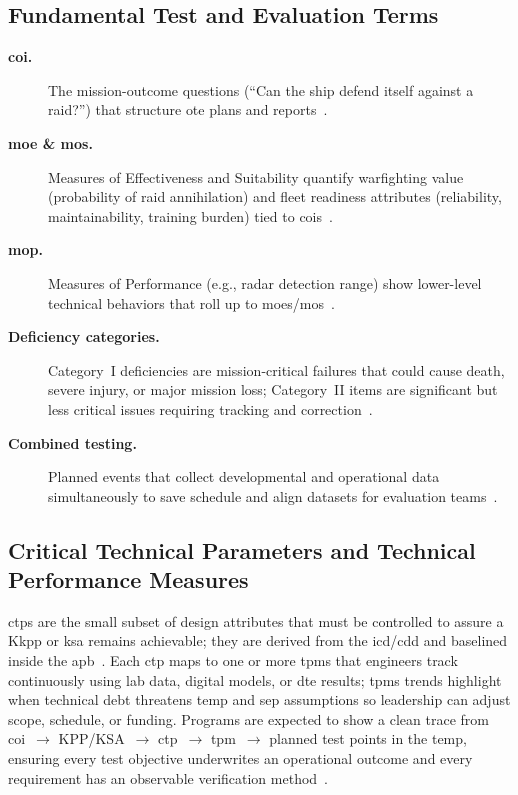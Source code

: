 \documentclass[../main.tex]{subfiles}
\begin{document}
\subsection{Fundamental Test and Evaluation Terms}
\begin{description}
	\item[\textbf{\ac{coi}.}] The mission-outcome questions (``Can the ship defend itself against a raid?'') that structure \ac{ote} plans and reports~\autocite{edo-3-5-6-test-eval-part-ii-2025}.
	\item[\textbf{\ac{moe} \& \ac{mos}.}] Measures of Effectiveness and Suitability quantify warfighting value (probability of raid annihilation) and fleet readiness attributes (reliability, maintainability, training burden) tied to \acp{coi}~\autocite{edo-3-5-6-test-eval-part-ii-2025}.
	\item[\textbf{\ac{mop}.}] Measures of Performance (e.g., radar detection range) show lower-level technical behaviors that roll up to \acp{moe}/\ac{mos}~\autocite{edo-3-5-5-test-eval-part-i-2025}.
	\item[\textbf{Deficiency categories.}] Category~I deficiencies are mission-critical failures that could cause death, severe injury, or major mission loss; Category~II items are significant but less critical issues requiring tracking and correction~\autocite{edo-3-5-6-test-eval-part-ii-2025}.
	\item[\textbf{Combined testing.}] Planned events that collect developmental and operational data simultaneously to save schedule and align datasets for evaluation teams~\autocite{DoDI5000-02}.
\end{description}

\subsection{Critical Technical Parameters and Technical Performance Measures}
\acp{ctp} are the small subset of design attributes that must be controlled to assure a K\ac{kpp} or \ac{ksa} remains achievable; they are derived from the \ac{icd}/\ac{cdd} and baselined inside the \ac{apb}~\autocite{DoDI5000-85}. Each \ac{ctp} maps to one or more \acp{tpm} that engineers track continuously using lab data, digital models, or \ac{dte} results; \acp{tpm} trends highlight when technical debt threatens \ac{temp} and \ac{sep} assumptions so leadership can adjust scope, schedule, or funding. Programs are expected to show a clean trace from \ac{coi}~$\rightarrow$ KPP/KSA~$\rightarrow$ \ac{ctp}~$\rightarrow$ \ac{tpm}~$\rightarrow$ planned test points in the \ac{temp}, ensuring every test objective underwrites an operational outcome and every requirement has an observable verification method~\autocite{DoDI5000-89,edo-3-5-5-test-eval-part-i-2025}.
\end{document}
